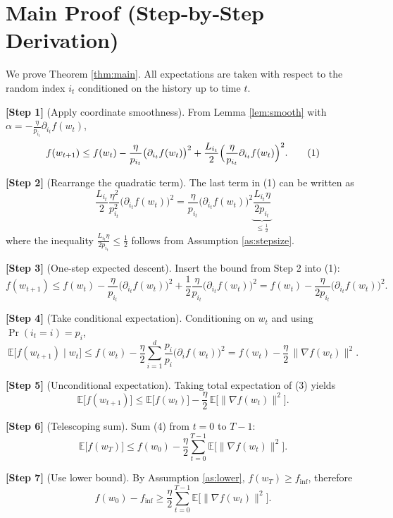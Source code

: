 \documentclass{article}
\newcommand{\E}{\mathbb{E}}
\begin{document}
\section*{Main Proof (Step‑by‑Step Derivation)}
We prove Theorem \ref{thm:main}.  All expectations are taken with respect to the random index $i_t$ conditioned on the history up to time $t$.

\bigskip
\noindent\textbf{[Step 1]} (Apply coordinate smoothness).  
From Lemma \ref{lem:smooth} with $\alpha=-\frac{\eta}{p_{i_t}}\partial_{i_t}f(w_t)$,
\[
f(w_{t+1})
   \le f(w_t)-\frac{\eta}{p_{i_t}}\bigl(\partial_{i_t}f(w_t)\bigr)^{2}
       +\frac{L_{i_t}}{2}\Bigl(\frac{\eta}{p_{i_t}}\partial_{i_t}f(w_t)\Bigr)^{2}.
\tag{1}
\]

\noindent\textbf{[Step 2]} (Rearrange the quadratic term).  
The last term in (1) can be written as
\[
\frac{L_{i_t}}{2}\frac{\eta^{2}}{p_{i_t}^{2}}\bigl(\partial_{i_t}f(w_t)\bigr)^{2}
   =\frac{\eta}{p_{i_t}}\bigl(\partial_{i_t}f(w_t)\bigr)^{2}
     \underbrace{\frac{L_{i_t}\eta}{2p_{i_t}}}_{\displaystyle\le\frac12}
\]
where the inequality $\frac{L_{i_t}\eta}{2p_{i_t}}\le\frac12$ follows from Assumption \ref{as:stepsize}.

\noindent\textbf{[Step 3]} (One‑step expected descent).  
Insert the bound from Step 2 into (1):
\[
f(w_{t+1})
   \le f(w_t)-\frac{\eta}{p_{i_t}}\bigl(\partial_{i_t}f(w_t)\bigr)^{2}
        +\frac{1}{2}\frac{\eta}{p_{i_t}}\bigl(\partial_{i_t}f(w_t)\bigr)^{2}
   = f(w_t)-\frac{\eta}{2p_{i_t}}\bigl(\partial_{i_t}f(w_t)\bigr)^{2}.
\tag{2}
\]

\noindent\textbf{[Step 4]} (Take conditional expectation).  
Conditioning on $w_t$ and using $\Pr(i_t=i)=p_i$,
\[
\E\!\bigl[f(w_{t+1})\mid w_t\bigr]
   \le f(w_t)-\frac{\eta}{2}\sum_{i=1}^{d}
        \frac{p_i}{p_i}\bigl(\partial_i f(w_t)\bigr)^{2}
   = f(w_t)-\frac{\eta}{2}\,\|\nabla f(w_t)\|^{2}.
\tag{3}
\]

\noindent\textbf{[Step 5]} (Unconditional expectation).  
Taking total expectation of (3) yields
\[
\E\!\bigl[f(w_{t+1})\bigr]
   \le \E\!\bigl[f(w_t)\bigr]-\frac{\eta}{2}\,\E\!\bigl[\|\nabla f(w_t)\|^{2}\bigr].
\tag{4}
\]

\noindent\textbf{[Step 6]} (Telescoping sum).  
Sum (4) from $t=0$ to $T-1$:
\[
\E\!\bigl[f(w_T)\bigr]
   \le f(w_0)-\frac{\eta}{2}\sum_{t=0}^{T-1}
        \E\!\bigl[\|\nabla f(w_t)\|^{2}\bigr].
\tag{5}
\]

\noindent\textbf{[Step 7]} (Use lower bound).  
By Assumption \ref{as:lower}, $f(w_T)\ge f_{\inf}$, therefore
\[
f(w_0)-f_{\inf}
   \ge \frac{\eta}{2}\sum_{t=0}^{T-1}
        \E\!\bigl[\|\nabla f(w_t)\|^{2}\bigr].
\tag{6}
\]
\end{document}
